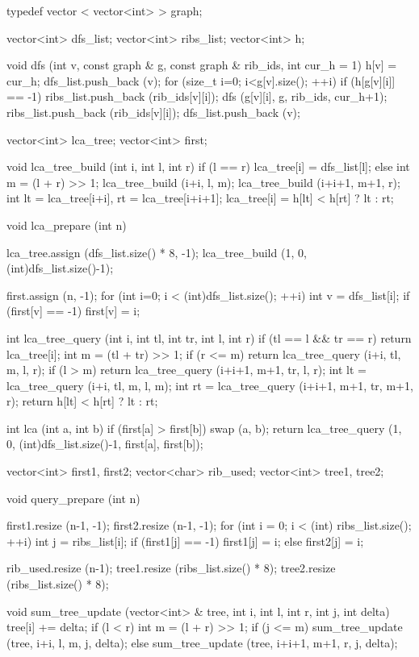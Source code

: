 typedef vector < vector<int> > graph;

vector<int> dfs_list;
vector<int> ribs_list;
vector<int> h;

void dfs (int v, const graph & g, const graph & rib_ids, int cur_h = 1)
{
	h[v] = cur_h;
	dfs_list.push_back (v);
	for (size_t i=0; i<g[v].size(); ++i)
		if (h[g[v][i]] == -1)
		{
			ribs_list.push_back (rib_ids[v][i]);
			dfs (g[v][i], g, rib_ids, cur_h+1);
			ribs_list.push_back (rib_ids[v][i]);
			dfs_list.push_back (v);
		}
}

vector<int> lca_tree;
vector<int> first;

void lca_tree_build (int i, int l, int r)
{
	if (l == r)
		lca_tree[i] = dfs_list[l];
	else
	{
		int m = (l + r) >> 1;
		lca_tree_build (i+i, l, m);
		lca_tree_build (i+i+1, m+1, r);
		int lt = lca_tree[i+i],  rt = lca_tree[i+i+1];
		lca_tree[i] = h[lt] < h[rt] ? lt : rt;
	}
}

void lca_prepare (int n)
{
	lca_tree.assign (dfs_list.size() * 8, -1);
	lca_tree_build (1, 0, (int)dfs_list.size()-1);

	first.assign (n, -1);
	for (int i=0; i < (int)dfs_list.size(); ++i)
	{
		int v = dfs_list[i];
		if (first[v] == -1)  first[v] = i;
	}
}

int lca_tree_query (int i, int tl, int tr, int l, int r)
{
	if (tl == l && tr == r)
		return lca_tree[i];
	int m = (tl + tr) >> 1;
	if (r <= m)
		return lca_tree_query (i+i, tl, m, l, r);
	if (l > m)
		return lca_tree_query (i+i+1, m+1, tr, l, r);
	int lt = lca_tree_query (i+i, tl, m, l, m);
	int rt = lca_tree_query (i+i+1, m+1, tr, m+1, r);
	return h[lt] < h[rt] ? lt : rt;
}

int lca (int a, int b)
{
	if (first[a] > first[b])  swap (a, b);
	return lca_tree_query (1, 0, (int)dfs_list.size()-1, first[a], first[b]);
}


vector<int> first1, first2;
vector<char> rib_used;
vector<int> tree1, tree2;

void query_prepare (int n)
{
	first1.resize (n-1, -1);
	first2.resize (n-1, -1);
	for (int i = 0; i < (int) ribs_list.size(); ++i)
	{
		int j = ribs_list[i];
		if (first1[j] == -1)
			first1[j] = i;
		else
			first2[j] = i;
	}

	rib_used.resize (n-1);
	tree1.resize (ribs_list.size() * 8);
	tree2.resize (ribs_list.size() * 8);
}

void sum_tree_update (vector<int> & tree, int i, int l, int r, int j, int delta)
{
	tree[i] += delta;
	if (l < r)
	{
		int m = (l + r) >> 1;
		if (j <= m)
			sum_tree_update (tree, i+i, l, m, j, delta);
		else
			sum_tree_update (tree, i+i+1, m+1, r, j, delta);
	}
}

